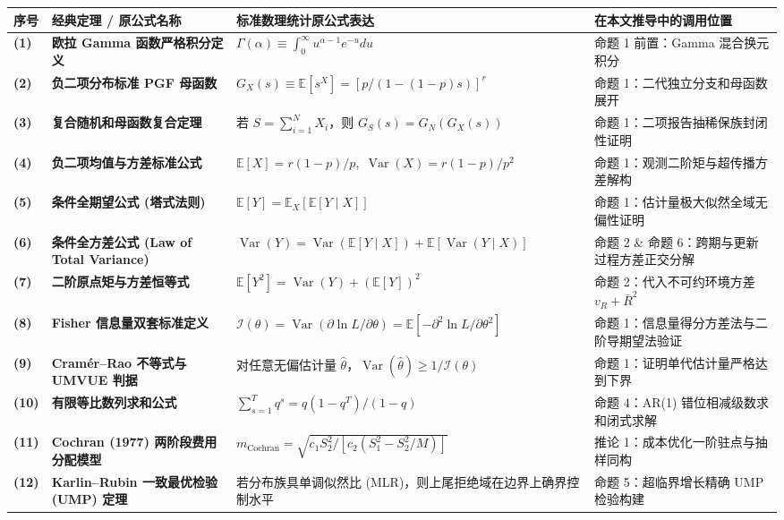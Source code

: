 \documentclass[11pt,a4paper]{ctexart}
\begin{document}
\begin{table}[htbp]
\centering
\small
\begin{tabular}{llll}
\toprule
\textbf{序号} & \textbf{经典定理 / 原公式名称} & \textbf{标准数理统计原公式表达} & \textbf{在本文推导中的调用位置} \\
\midrule
\textbf{(1)} & \textbf{欧拉 Gamma 函数严格积分定义} & $\Gamma(\alpha) \equiv \int_0^\infty u^{\alpha-1} e^{-u} du$ & 命题 1 前置：Gamma 混合换元积分 \\
\textbf{(2)} & \textbf{负二项分布标准 PGF 母函数} & $G_X(s) \equiv \mathbb{E}[s^X] = [p / (1 - (1-p)s)]^r$ & 命题 1：二代独立分支和母函数展开 \\
\textbf{(3)} & \textbf{复合随机和母函数复合定理} & 若 $S = \sum_{i=1}^N X_i$，则 $G_S(s) = G_N(G_X(s))$ & 命题 1：二项报告抽稀保族封闭性证明 \\
\textbf{(4)} & \textbf{负二项均值与方差标准公式} & $\mathbb{E}[X] = r(1-p)/p, \; \operatorname{Var}(X) = r(1-p)/p^2$ & 命题 1：观测二阶矩与超传播方差解构 \\
\textbf{(5)} & \textbf{条件全期望公式 (塔式法则)} & $\mathbb{E}[Y] = \mathbb{E}_X[ \mathbb{E}[Y \mid X] ]$ & 命题 1：估计量极大似然全域无偏性证明 \\
\textbf{(6)} & \textbf{条件全方差公式 (Law of Total Variance)} & $\operatorname{Var}(Y) = \operatorname{Var}(\mathbb{E}[Y \mid X]) + \mathbb{E}[\operatorname{Var}(Y \mid X)]$ & 命题 2 \& 命题 6：跨期与更新过程方差正交分解 \\
\textbf{(7)} & \textbf{二阶原点矩与方差恒等式} & $\mathbb{E}[Y^2] = \operatorname{Var}(Y) + (\mathbb{E}[Y])^2$ & 命题 2：代入不可约环境方差 $v_R + \bar{R}^2$ \\
\textbf{(8)} & \textbf{Fisher 信息量双套标准定义} & $\mathcal{I}(\theta) = \operatorname{Var}(\partial \ln L / \partial \theta) = \mathbb{E}[-\partial^2 \ln L / \partial \theta^2]$ & 命题 1：信息量得分方差法与二阶导期望法验证 \\
\textbf{(9)} & \textbf{Cramér–Rao 不等式与 UMVUE 判据} & 对任意无偏估计量 $\hat{\theta}$，$\operatorname{Var}(\hat{\theta}) \ge 1/\mathcal{I}(\theta)$ & 命题 1：证明单代估计量严格达到下界 \\
\textbf{(10)} & \textbf{有限等比数列求和公式} & $\sum_{s=1}^T q^s = q(1 - q^T)/(1 - q)$ & 命题 4：AR(1) 错位相减级数求和闭式求解 \\
\textbf{(11)} & \textbf{Cochran (1977) 两阶段费用分配模型} & $m_{\text{Cochran}} = \sqrt{c_1 S_2^2 / [c_2 (S_1^2 - S_2^2/M)]}$ & 推论 1：成本优化一阶驻点与抽样同构 \\
\textbf{(12)} & \textbf{Karlin–Rubin 一致最优检验 (UMP) 定理} & 若分布族具单调似然比 (MLR)，则上尾拒绝域在边界上确界控制水平 & 命题 5：超临界增长精确 UMP 检验构建 \\
\bottomrule
\end{tabular}
\end{table}
\end{document}
